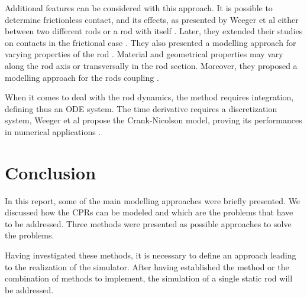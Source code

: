 \documentclass{thesisreport}
\begin{document}
 Additional features can be considered with this approach. It is possible to determine frictionless contact, and its effects, as presented by Weeger et al either between two different rods or a rod with itself \cite{weeger_isogeometric_2017}. Later, they extended their studies on contacts in the frictional case \cite{weeger_isogeometric_2018}. They also presented a modelling approach for varying properties of the rod \cite{weeger_fully_2018}. Material and geometrical properties may vary along the rod axis or transversally in the rod section. Moreover, they proposed a modelling approach for the rods coupling \cite{weeger_isogeometric_2017-1}.
 
 When it comes to deal with the rod dynamics, the method requires integration, defining thus an ODE system. The time derivative requires a discretization system, Weeger et al propose the Crank-Nicolson model, proving its performances in numerical applications \cite{weeger_isogeometric_2018}. 


 \chapter*{Conclusion}
 
 In this report, some of the main modelling approaches were briefly presented. We discussed how the CPRs can be modeled and which are the problems that have to be addressed. Three methods were presented as possible approaches to solve the problems. 
 
 
 Having investigated these methods, it is necessary to define an approach leading to the realization of the simulator. After having established the method or the combination of methods to implement, the simulation of a single static rod will be addressed. 
 
 

 
 
 
 
 
 
\end{document}
